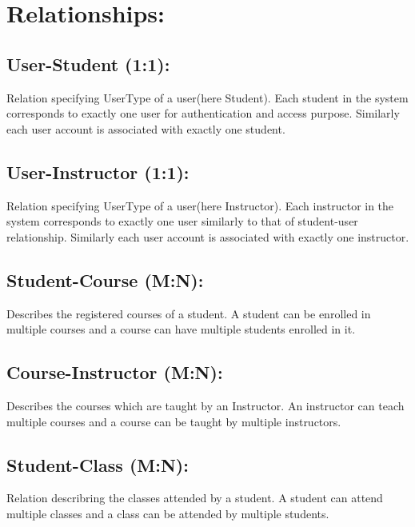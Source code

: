 \documentclass{article}
\begin{document}
\newpage

\section*{\LARGE{Relationships:}}

\subsection*{User-Student (1:1):}
\begin{large}
Relation specifying UserType of a user(here Student). Each student in the system corresponds to exactly one user for authentication and access purpose.
Similarly each user account is associated with exactly one student. 
\end{large}

\subsection*{User-Instructor (1:1):}
\begin{large}
Relation specifying UserType of a user(here Instructor). Each instructor in the system corresponds to exactly one user similarly to that of student-user relationship.
Similarly each user account is associated with exactly one instructor. 
\end{large}

\subsection*{Student-Course (M:N):}
\begin{large}
Describes the registered courses of a student. A student can be enrolled in multiple courses and a course can have multiple students 
enrolled in it. 
\end{large}

\subsection*{Course-Instructor (M:N):}
\begin{large}
Describes the courses which are taught by an Instructor. An instructor can teach multiple courses and a course can be taught by multiple instructors.
\end{large}

\subsection*{Student-Class (M:N):}
\begin{large}
Relation describring the classes attended by a student. A student can attend multiple classes and a class can be attended by multiple students.
\end{large}
\end{document}

